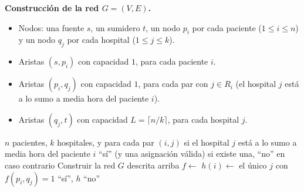 \textbf{Construcción de la red $G=(V,E)$.}
\begin{itemize}
\item Nodos: una fuente $s$, un sumidero $t$, un nodo $p_i$ por cada paciente ($1\le i\le n$) y un nodo $q_j$ por cada hospital ($1\le j\le k$).
\item Aristas $(s,p_i)$ con capacidad $1$, para cada paciente $i$.
\item Aristas $(p_i,q_j)$ con capacidad $1$, para cada par con $j\in R_i$ (el hospital $j$ está a lo sumo a media hora del paciente $i$).
\item Aristas $(q_j,t)$ con capacidad $L=\lceil n/k\rceil$, para cada hospital $j$.
\end{itemize}

\begin{center}
\end{center}

\begin{algorithm}[H]
\caption{Traslado equilibrado de pacientes}
\begin{algorithmic}[1]
\Require $n$ pacientes, $k$ hospitales, y para cada par $(i,j)$ si el hospital $j$ está a lo sumo a media hora del paciente $i$
\Ensure ``sí'' (y una asignación válida) si existe una, ``no'' en caso contrario
\State Construir la red $G$ descrita arriba
\State $f\gets$  
     \State $h(i)\gets$ el único $j$ con $f(p_i,q_j)=1$
  \EndFor
  \State \Return ``sí'', $h$
\Else
  \State \Return ``no''
\EndIf
\end{algorithmic}
\end{algorithm}

